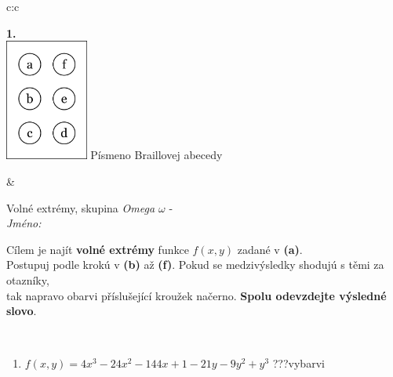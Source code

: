\documentclass[10pt]{report}
\begin{document}
\begin{tabular}{c:c}
\begin{minipage}[c][104.5mm][t]{0.5\linewidth}
\begin{center}
\begin{minipage}{0.79\linewidth}
\begin{center}
\begin{varwidth}{\linewidth}
\begin{enumerate}
\end{enumerate}
\end{varwidth}
\end{center}
\end{minipage}
\begin{minipage}{0.20\linewidth}
\begin{center}
{\Huge\bfseries 1.} \\[2mm]
\includegraphics[height=40mm]{../images/braille.png}
{\small Písmeno Braillovej abecedy}
\end{center}
\end{minipage}
\end{center}
\end{minipage}
&
\begin{minipage}[c][104.5mm][t]{0.5\linewidth}
\begin{center}
\vspace{7mm}
{\huge Volné extrémy, skupina \textit{Omega $\omega$} -}\\[5mm]
\textit{Jméno:}\phantom{xxxxxxxxxxxxxxxxxxxxxxxxxxxxxxxxxxxxxxxxxxxxxxxxxxxxxxxxxxxxxxxxx}\\[5mm]
\begin{minipage}{0.95\linewidth}
\begin{center}
Cílem je najít \textbf{volné extrémy} funkce $f(x,y)$ zadané v \textbf{(a)}.\\Postupuj podle krokú v \textbf{(b)} až \textbf{(f)}. Pokud se medzivýsledky shodujú s těmi za otazníky,\\tak napravo obarvi příslušející kroužek načerno. \textbf{Spolu odevzdejte výsledné slovo}.
\end{center}
\end{minipage}
\\[1mm]
\begin{minipage}{0.79\linewidth}
\begin{center}
\begin{varwidth}{\linewidth}
\begin{enumerate}
\normalsize
\item $f(x,y)=4x^3-24x^2-144x+1-21y-9y^2+y^3$\quad \dotfill\; ???\;\dotfill \quad vybarvi

\end{enumerate}
\end{varwidth}
\end{center}
\end{minipage}
\end{center}
\end{minipage}
\end{tabular}
\end{document}
